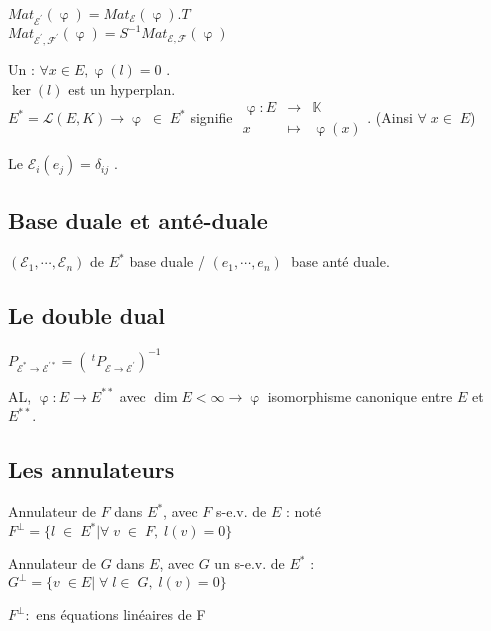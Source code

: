 \documentclass[11pt]{article} %
\begin{document}
\proposition $Mat_{\mathcal{E}^{'}}(\upvarphi) = Mat_{\mathcal{E}} (\upvarphi) .T$ \\
$Mat_{\mathcal{E}^{'}, \mathcal{F^{'}}}(\upvarphi) = S^{-1}Mat_{\mathcal{E}, \mathcal{F}} (\upvarphi)$

 Un  :  $ \forall x \in E, \upvarphi(l)=0$ . \\
$\ker (l)$ est un hyperplan. \\ $ E^* = \mathcal{L}(E,K) \longrightarrow \upvarphi \; \in \; E^* $ signifie $\begin{array}{rcl}
\upvarphi:E &\to& \mathbb{K}\\
x &\mapsto & \upvarphi(x)
\end{array}$. (Ainsi $ \forall \; x \in \; E$)


 Le  $ \mathcal{E}_{i}(e_{j})= \delta_{ij}$ .


\subsection{Base duale et anté-duale}


 $( \mathcal{E}_1, \cdots , \mathcal{E}_n ) $ de $E^{*}$ base duale / $(e_1, \cdots , e_n) \; $ base anté duale.

\newpage

\subsection{Le double dual}

\proposition $P_{\mathcal{E}^{*} \to \mathcal{E}^{'*}} = (~^tP_{\mathcal{E} \to \mathcal{E}^{'}})^{-1}$

\corollaire AL, $\upvarphi: E \to E^{**}$   avec $\dim E < \infty \longrightarrow \upvarphi $ isomorphisme canonique entre $E $ et $  E^{**}$.

\subsection{Les annulateurs}

 Annulateur de $F$ dans $E^{*}$, avec $F$ s-e.v. de $E$ : noté $F^{\bot} = \{ l \; \in \; E^{*} | \forall \; v \; \in \; F, \; l(v)=0  \} $

 Annulateur de $G$ dans $E$, avec $G$ un s-e.v. de $E^{*}$ :$G^{\bot} = \{ v \; \in E | \; \forall \; l \in \; G, \; l(v)=0 \}$

 $F^{\bot} :$ ens équations linéaires de F
\end{document}
